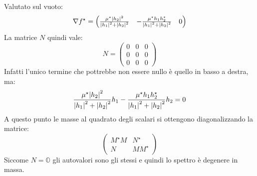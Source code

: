 \documentclass[]{scrartcl}
\begin{document}
Valutato sul vuoto:
\[
  \nabla f^\star =
  \begin{pmatrix}
    \frac{\mu^\star \abs{h_2}^2}{\abs{h_1}^2 + \abs{h_2}^2} & -\frac{\mu^\star h_1 h_2^\star}{{\abs{h_1}^2 + \abs{h_2}^2}} & 0
  \end{pmatrix}
\]
La matrice $ N $ quindi vale:
\[
  N =
  \begin{pmatrix}
    0         & 0   & 0   \\
    0         & 0   & 0   \\
    0         & 0   & 0
  \end{pmatrix}
\]
Infatti l'unico termine che pottrebbe non essere nullo è quello in basso a destra, ma:
\[
  \frac{\mu^\star \abs{h_2}^2}{\abs{h_1}^2 + \abs{h_2}^2} h_1 -\frac{\mu^\star h_1 h_2^\star}{{\abs{h_1}^2 + \abs{h_2}^2}} h_2 = 0
\]
A questo punto le masse al quadrato degli scalari si ottengono diagonalizzando la matrice:
\[
  \left(
  \begin{array}{c|c}
    M^\star M & N^\star   \\ \hline
    N         & M M^\star
  \end{array}
  \right)
\]
Siccome $ N = \mathbb{O} $ gli autovalori sono gli stessi e quindi lo spettro è degenere in massa.
\end{document}
